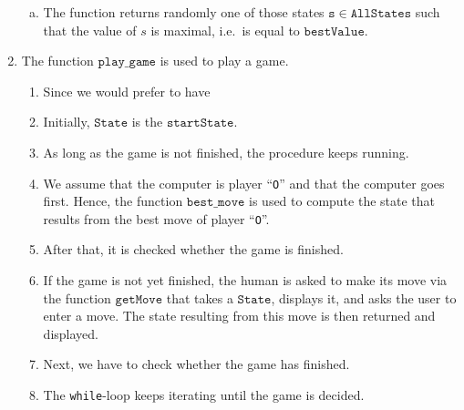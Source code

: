 \begin{enumerate}
\begin{enumerate}[(a)]
      \item The function returns randomly one of those states $\mathtt{s} \in \mathtt{AllStates}$ such that 
            the value of $s$ is maximal, i.e.~is equal to $\mathtt{bestValue}$.
      \end{enumerate}
\item The function $\mathtt{play\_game}$ is used to play a game.
      \begin{enumerate}
      \item Since we would prefer to have 
      \item Initially, $\mathtt{State}$ is the $\mathtt{startState}$.
      \item As long as the game is not finished, the procedure keeps running.
      \item We assume that the computer is player ``\texttt{O}'' and that the computer goes first.
            Hence, the function $\mathtt{best\_move}$ is used to compute the state that results from the best
            move of player ``\texttt{O}''.
      \item After that, it is checked whether the game is finished.
      \item If the game is not  yet finished, the human is asked to make its move via the function
            $\mathtt{getMove}$ that takes a $\mathtt{State}$, displays it, and asks the user to enter a move.
            The state resulting from this move is then returned and displayed.
      \item Next, we have to check whether the game has finished.
      \item The \texttt{while}-loop keeps iterating until the game is decided.
      \end{enumerate}
\end{enumerate}

